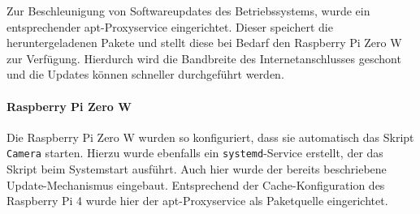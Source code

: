 \documentclass[./00PhotoBox.tex]{subfiles}
\begin{document}
Zur Beschleunigung von Softwareupdates des Betriebssystems, wurde ein entsprechender apt-Proxyservice eingerichtet. Dieser speichert die heruntergeladenen Pakete und stellt diese bei Bedarf den Raspberry Pi Zero W zur Verfügung. Hierdurch wird die Bandbreite des Internetanschlusses geschont und die Updates können schneller durchgeführt werden.

\paragraph{Raspberry Pi Zero W}
Die Raspberry Pi Zero W wurden so konfiguriert, dass sie automatisch das Skript \texttt{Camera} starten. Hierzu wurde ebenfalls ein \texttt{systemd}-Service erstellt, der das Skript beim Systemstart ausführt. Auch hier wurde der bereits beschriebene Update-Mechanismus eingebaut. Entsprechend der Cache-Konfiguration des Raspberry Pi 4 wurde hier der apt-Proxyservice als Paketquelle eingerichtet.


\biblio
\end{document}
